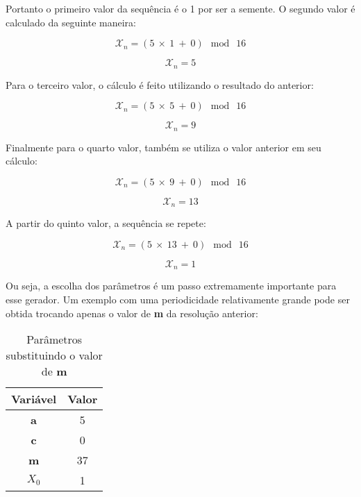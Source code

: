 Portanto o primeiro valor da sequência é o 1 por ser a semente. O segundo valor é calculado da seguinte maneira: 

\begin{equation}
	\label{Cálculo do segundo valor}
	\mathcal{X}_n = ( 5 \: \times \: 1 \: + \: 0) \: \bmod \: 16
\end{equation}

\begin{equation}
	\label{Resultado do segundo valor}
	\mathcal{X}_n = 5
\end{equation}

Para o terceiro valor, o cálculo é feito utilizando o resultado do anterior:

\begin{equation}
	\label{Cálculo do terceiro valor}
	\mathcal{X}_n = ( 5 \: \times \: 5\: +\: 0)\: \bmod \: 16
\end{equation}

\begin{equation}
	\label{Resultado do terceiro valor}
	\mathcal{X}_n = 9
\end{equation}

Finalmente para o quarto valor, também se utiliza o valor anterior em seu cálculo:

\begin{equation}
	\label{Cálculo do quarto valor}
	\mathcal{X}_n = ( 5 \: \times \: 9 \: + \: 0) \: \bmod \: 16
\end{equation}

\begin{equation}
	\label{Resultado do quarto valor}
	\mathcal{X}_n = 13
\end{equation}

A partir do quinto valor, a sequência se repete:

\begin{equation}
	\label{Cálculo do quinto valor}
	\mathcal{X}_n = ( 5 \: \times \: 13 \: + \: 0) \: \bmod \: 16
\end{equation}

\begin{equation}
	\label{Resultado do quinto valor}
	\mathcal{X}_n = 1
\end{equation}

Ou seja, a escolha dos parâmetros é um passo extremamente importante para esse gerador. Um exemplo com uma periodicidade relativamente grande pode ser obtida trocando apenas o valor de \textbf{m} da resolução anterior:

\begin{table}[h]
	\centering
	\begin{tabular}{ c c }	
		\toprule
		Variável & Valor \\ \hline
		\textbf{a} & 5 \\ \hline
		\textbf{c} & 0 \\ \hline
		\textbf{m} & 37 \\ \hline
		\textbf{$X_0$} & 1 \\ \hline
	\end{tabular}
	\caption{Parâmetros substituindo o valor de \textbf{m}}
\end{table}

